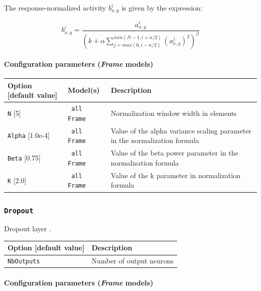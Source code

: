 \documentclass[a4paper,11pt,oneside]{article}
\begin{document}
The response-normalized activity $b_{x,y}^{i}$ is given by the expression:

\[ b_{x,y}^{i} = \frac{a_{x,y}^{i}}{\left(k + \alpha \sum\limits_{j=max(0,i-n/2)}^{min(N-1,i+n/2)}{\left(a_{x,y}^{j}\right)^2}\right)^{\beta}} \]

\paragraph{Configuration parameters (\emph{Frame} models)}

\begin{center}
 \begin{longtable}{| p{4cm} | p{3cm} | p{9cm} | }
 \hline
 Option [default value] & Model(s) & Description\\
 \hline\hline
  \lstinline!N! [5] & \lstinline! all Frame ! & Normalization window width in
  elements \\
  \lstinline!Alpha! [1.0e-4] & \lstinline! all Frame ! & Value of the alpha
  variance scaling parameter in the normalization formula \\
  \lstinline!Beta! [0.75] & \lstinline! all Frame ! & Value of the beta power
  parameter in the normalization formula \\
  \lstinline!K! [2.0] & \lstinline! all Frame ! & Value of the k parameter in
  normalization formula \\
 \hline
\end{longtable}
\end{center}

\subsubsection{\texorpdfstring{%
\lstinline[basicstyle=\ttfamily\bfseries]!Dropout!}{Dropout}}
Dropout layer \citep{Srivastava2014}.

\begin{center}
 \begin{longtable}{| p{5cm} | p{10cm} | }
 \hline
 Option [default value] & Description\\
 \hline\hline
  \cellcolor{requiredcolor}\lstinline!NbOutputs! & Number of output neurons \\
 \hline
\end{longtable}
\end{center}

\paragraph{Configuration parameters (\emph{Frame} models)}
\end{document}
